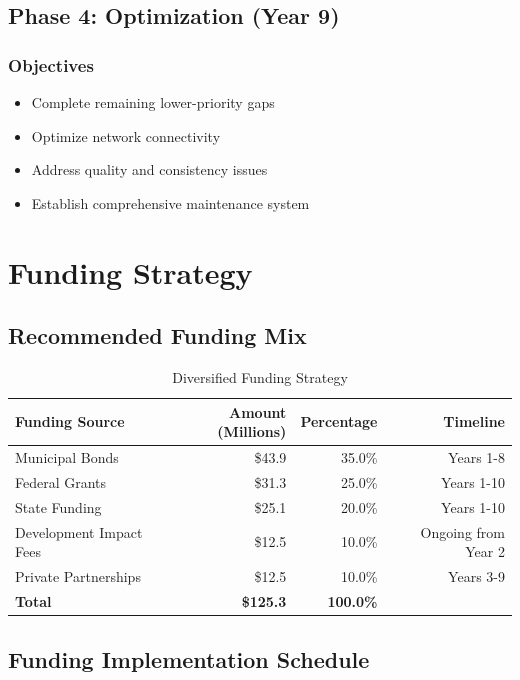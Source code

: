 \documentclass[11pt,letterpaper]{article}
\begin{document}
\subsection{Phase 4: Optimization (Year 9)}

\subsubsection{Objectives}
\begin{itemize}
    \item Complete remaining lower-priority gaps
    \item Optimize network connectivity
    \item Address quality and consistency issues
    \item Establish comprehensive maintenance system
\end{itemize}

\section{Funding Strategy}

\subsection{Recommended Funding Mix}

\begin{table}[h]
\centering
\caption{Diversified Funding Strategy}
\begin{tabular}{lrrr}
\toprule
\textbf{Funding Source} & \textbf{Amount (Millions)} & \textbf{Percentage} & \textbf{Timeline} \\
\midrule
Municipal Bonds & \$43.9 & 35.0\% & Years 1-8 \\
Federal Grants & \$31.3 & 25.0\% & Years 1-10 \\
State Funding & \$25.1 & 20.0\% & Years 1-10 \\
Development Impact Fees & \$12.5 & 10.0\% & Ongoing from Year 2 \\
Private Partnerships & \$12.5 & 10.0\% & Years 3-9 \\
\textbf{Total} & \textbf{\$125.3} & \textbf{100.0\%} & \\
\bottomrule
\end{tabular}
\end{table}

\subsection{Funding Implementation Schedule}
\end{document}
